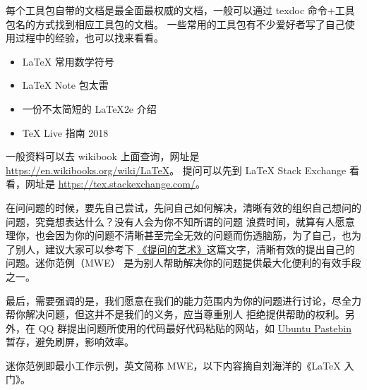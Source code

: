 







每个工具包自带的文档是最全面最权威的文档，一般可以通过 texdoc
命令+工具包名的方式找到相应工具包的文档。
一些常用的工具包有不少爱好者写了自己使用过程中的经验，也可以找来看看。


\begin{itemize}
  \item \LaTeX{} 常用数学符号
  \item \LaTeX{} Note 包太雷
  \item 一份不太简短的 \LaTeX{2e} 介绍
  \item \TeX{} Live 指南 2018
\end{itemize}


一般资料可以去 wikibook 上面查询，网址是
\url{https://en.wikibooks.org/wiki/LaTeX}。
提问可以先到 \LaTeX{} Stack Exchange 看看，网址是
\url{https://tex.stackexchange.com/}。



在问问题的时候，要先自己尝试，先问自己如何解决，清晰有效的组织自己想问的问题，究竟想表达什么？没有人会为你不知所谓的问题
浪费时间，就算有人愿意理你，也会因为你的问题不清晰甚至完全无效的问题而伤透脑筋，为了自己，也为了别人，建议大家可以参考下
\href{https://www.jianshu.com/p/f96aa7f7bf59}{《提问的艺术》}这篇文字，清晰有效的提出自己的问题。迷你范例（MWE）
是为别人帮助解决你的问题提供最大化便利的有效手段之一。

最后，需要强调的是，我们愿意在我们的能力范围内为你的问题进行讨论，尽全力帮你解决问题，但这并不是我们的义务，应当尊重别人
拒绝提供帮助的权利。另外，在 QQ 群提出问题所使用的代码最好代码粘贴的网站，如
\href{https://paste.ubuntu.com/}{Ubuntu Pastebin}
暂存，避免刷屏，影响效率。


迷你范例即最小工作示例，英文简称 MWE，以下内容摘自刘海洋的《\LaTeX{} 入门》。

